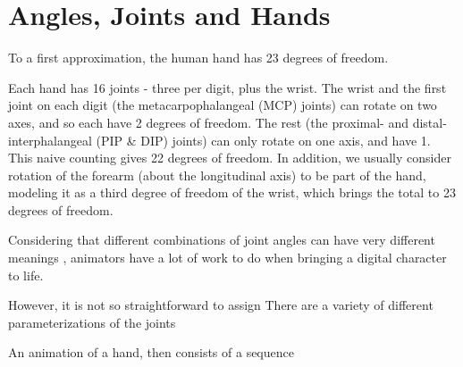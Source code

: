 \chapter{Angles, Joints and Hands}
\label{C:angles-joints-hands}

To a first approximation, the human hand has 23 degrees of freedom.

Each hand has 16 joints - three per digit, plus the wrist. The wrist and the first joint on each digit (the metacarpophalangeal (MCP) joints) can rotate on two axes, and so each have 2 degrees of freedom. The rest (the proximal- and distal-interphalangeal (PIP \& DIP) joints) can only rotate on one axis, and have 1. This naive counting gives 22 degrees of freedom. In addition, we usually consider rotation of the forearm (about the longitudinal axis) to be part of the hand, modeling it as a third degree of freedom of the wrist, which brings the total to 23 degrees of freedom.

Considering that different combinations of joint angles can have very {\Large\Large{}} different {\Large\Large{}} meanings {\Large\Large{}},
animators have a lot of work to do when bringing a digital character to life.


However, it is not so straightforward to assign There are a variety of different parameterizations of the joints

An animation of a hand, then consists of a sequence 



